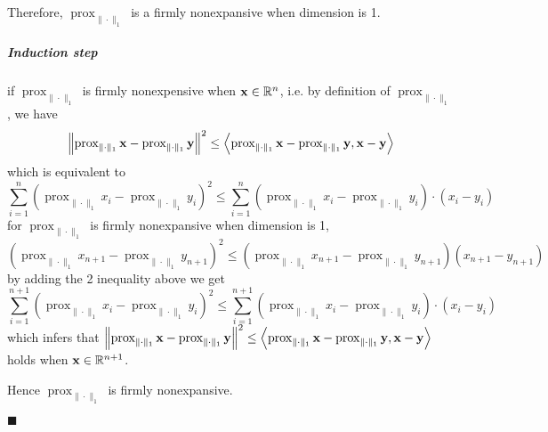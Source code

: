 \documentclass[11pt]{article}
\def\bx{\bold x}
\def\by{\bold y}
\newcommand\norm[1]{\left\lVert#1\right\rVert}
\newcommand\vc[1]{\left\langle{#1}\right\rangle }
\newcommand*{\QEDA}{\hfill\ensuremath{\blacksquare}}
\newcommand\bra[1]{\left( #1 \right)}
\def \pr{\operatorname{prox}_{\|\cdot\|_{1}}}
\def \px{\pr \bx}
\def \py{\pr \by}
\begin{document}
Therefore, $\pr$ is a firmly nonexpansive when dimension is 1.

\subparagraph{Induction step}
if $\pr$ is firmly nonexpensive when $\bx \in \mathbb R^n$, i.e. by definition of $\pr$, we have
$$
\norm{\px - \py}^2 \leq \vc{\px - \py, \bx - \by}
$$
which is equivalent to 
$$
\sum_{i=1}^{n}\bra{\pr x_i - \pr y_i}^2 \leq \sum_{i=1}^{n}\bra{\pr x_i - \pr y_i}\cdot \bra{x_i - y_i}
$$
for $\pr$ is firmly nonexpansive when dimension is 1, 
$$
\bra{\pr x_{n+1} - \pr y_{n+1} }^2 \leq\bra{\pr x_{n+1} - \pr y_{n+1}}\bra{x_{n+1} - y_{n+1}}
$$
by adding the 2 inequality above we get 
$$
\sum_{i=1}^{n+1}\bra{\pr x_i - \pr y_i}^2 \leq \sum_{i=1}^{n+1}\bra{\pr x_i - \pr y_i}\cdot \bra{x_i - y_i}
$$
which infers that $\norm{\px - \py}^2 \leq \vc{\px - \py, \bx - \by}$ holds when $\bx \in \mathbb R^{n+1}$.

Hence $\pr$ is firmly nonexpansive.

\QEDA
\end{document}
